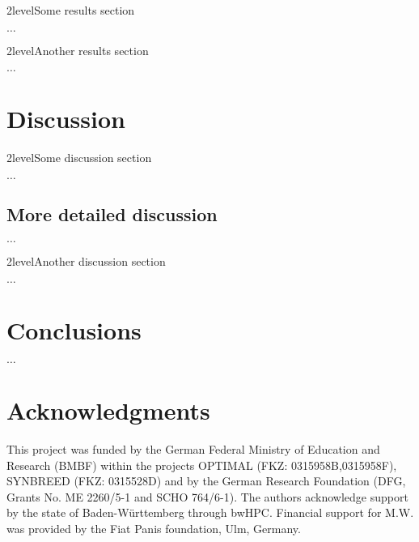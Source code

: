 \documentclass[12pt,titlepage]{article}
\begin{document}
\Genetics2level{Some results section}

$\dots$

\Genetics2level{Another results section}

$\dots$




\section*{Discussion}
\Genetics2level{Some discussion section}

$\dots$

\subsection{More detailed discussion}

$\dots$

\Genetics2level{Another discussion section}

$\dots$



\section*{Conclusions}

$\dots$




\section{Acknowledgments} 
This project was funded by the German Federal Ministry of Education and 
Research (BMBF) within the projects OPTIMAL (FKZ: 0315958B,0315958F),
SYNBREED (FKZ: 0315528D) and by the German Research Foundation 
(DFG, Grants No. ME 2260/5-1 and SCHO 764/6-1).
The authors acknowledge support by the state of Baden-W{\"u}rttemberg through 
bwHPC.
Financial support for M.W. was provided by the Fiat Panis foundation, Ulm,
Germany.



\nolinenumbers


\end{document}
